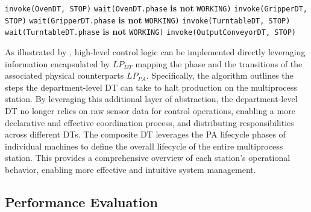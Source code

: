 \begin{algorithm}
\caption{Multiple DTs Stopping Procedure}
\begin{algorithmic}
\State \texttt{invoke(OvenDT, STOP)}
    \State \texttt{wait(OvenDT.phase} \textbf{is not} \texttt{WORKING)}
\EndWhile
\State \texttt{invoke(GripperDT, STOP)}
    \State \texttt{wait(GripperDT.phase} \textbf{is not} \texttt{WORKING)}
\EndWhile
\State \texttt{invoke(TurntableDT, STOP)}
    \State \texttt{wait(TurntableDT.phase} \textbf{is not} \texttt{WORKING)}
\EndWhile
\State \texttt{invoke(OutputConveyorDT, STOP)}
\end{algorithmic}
\label{code:soft-stop-logic}
\end{algorithm}

As illustrated by , high-level control logic can be implemented directly leveraging information encapsulated by $LP_{DT}$ mapping the phase and the transitions of the associated physical counterparts $LP_{PA}$. Specifically, the algorithm outlines the steps the department-level DT can take to halt production on the multiprocess station.
By leveraging this additional layer of abstraction, the department-level DT no longer relies on raw sensor data for control operations, enabling a more declarative and effective coordination process, and distributing responsibilities across different DTs.
%
The composite DT leverages the PA lifecycle phases of individual machines to define the overall lifecycle of the entire multiprocess station. This provides a comprehensive overview of each station's operational behavior, enabling more effective and intuitive system management.


\subsection{Performance Evaluation}


